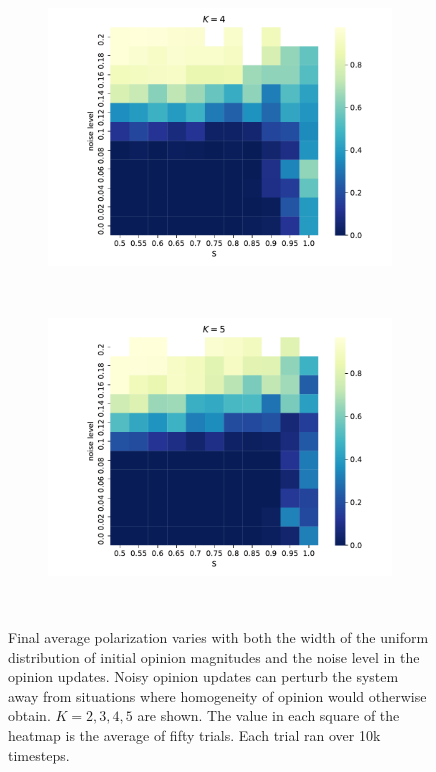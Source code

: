 \documentclass[11pt,letterpaper]{article}
\begin{document}
\begin{figure}[t!]
\begin{subfigure}[t]{0.49\textwidth}
          \caption{}
      \end{subfigure} \\
      \begin{subfigure}[t]{0.49\textwidth}
          \centering
          \includegraphics[width=\textwidth]{Figures/p_v_noise_k=4.pdf}
          \caption{}
      \end{subfigure}
      ~
      \begin{subfigure}[t]{0.49\textwidth}
          \centering
          \includegraphics[width=\textwidth]{Figures/p_v_noise_k=5.pdf}
          \caption{}
      \end{subfigure} \\
  \caption{Final average polarization varies with both the width of the
    uniform distribution of initial opinion magnitudes and the noise level in
    the opinion updates. Noisy opinion updates can perturb the system away from
    situations where homogeneity of opinion would otherwise obtain. $K=2,3,4,5$
    are shown. The value in each square of the heatmap is the average of
    fifty trials. Each trial ran over 10k timesteps.
  }
  \label{fig:heatmaps}
\end{figure}
\end{document}
